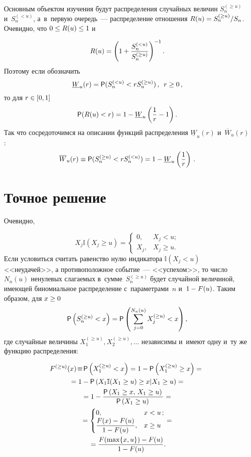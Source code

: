 \begin{multicols}{2}
Основным объектом изучения будут распределения случайных 
величин $S_n^{(\ge u)}$ и~$S_n^{(< u)}$, а~в~первую очередь~--- 
распределение отношения
$R(u)\hm=S_n^{(\ge u)}/S_n$. Очевидно, что $0\hm\le R(u)\hm\le 1$ и

\noindent
$$
R(u)=\left(1+\displaystyle\frac{\displaystyle S_n^{(<u)}\mathstrut}{\displaystyle S_n^{(\ge u)}\mathstrut}\right)^{-1}.
$$
Поэтому если обозначить 
$$
\underline{W}_u(r)\hm={\sf P}(S_n^{(<u)}
\hm<rS_n^{(\ge u)})\,, \enskip r\hm\ge 0\,,
$$
то для $r\hm\in[0,1]$
$$
{\sf P}(R(u)<r)=1-\underline{W}_u\left(\displaystyle\frac{\displaystyle 1\mathstrut}{\displaystyle r\mathstrut}-1\right).
$$
Так что сосредоточимся на описании функций распределения 
$\underline{W}_u(r)$ и~$\overline{W}_u(r)$:
$$\overline{W}_u(r)\hm\equiv {\sf P}(S_n^{(\ge u)}
\hm<rS_n^{(<u)})=1-\underline{W}_u\left(\fr{1}{r}\right)\,.
$$

\vspace*{-6pt}

\section{Точное решение}

\vspace*{-4pt}

Очевидно,

\vspace*{-2pt}

\noindent
$$
X_j\mathbb{I}(X_j\ge u)=
\begin{cases}0,& X_j< u;\\
X_j,& X_j\ge u.\end{cases}
$$
Если условиться считать равенство нулю индикатора $\mathbb{I}(X_j<u)$
<<неудачей>>, а противоположное событие~--- <<успехом>>, то число
$N_n(u)$ ненулевых слагаемых в~сумме~$S_n^{(\ge u)}$ будет случайной
величиной, имеющей биномиальное распределение с~па\-ра\-мет\-ра\-ми~$n$ 
и~$1\hm-F(u)$. Таким образом, для $x\hm\ge 0$
\begin{equation}
{\sf P}\left(S_n^{(\ge u)}<x\right)=
{\sf P}\left(\sum\limits_{j=0}^{N_n(u)}X_j^{(\ge
u)}<x\right),
\label{e1-kor}
\end{equation}
где случайные величины $X_1^{(\ge u)},X_2^{(\ge u)},\ldots$
независимы и~имеют одну и~ту же функцию распределения:

\noindent
\begin{multline*}
\!F^{(\ge u)}(x)\!\equiv\! {\sf P}\left(X_1^{(\ge u)}<x\right)=
1-{\sf P}\left(X_1^{(\ge u)}\ge x\right)={}\\
{}=
1-{\sf P}\left(X_1\mathbb{I}(X_1\ge u)\ge x|X_1\ge u\right)={}\\
{}=1-\displaystyle\frac{\displaystyle {\sf P}\left(X_1\ge x,\,X_1\ge u\right)\mathstrut}{\displaystyle {\sf P}\left(X_1\ge
u\right)\mathstrut}={}\\
{}=
\begin{cases}0, & x<u\,;\\
\displaystyle\displaystyle\frac{\displaystyle F(x)-F(u)\mathstrut}{\displaystyle 1-F(u)\mathstrut}, & x\ge u
\end{cases}
={}\\
{}=\displaystyle\frac{\displaystyle F(\max\{x,u\})-F(u)\mathstrut}{\displaystyle 1-F(u)\mathstrut}.
\end{multline*}


\end{multicols}
